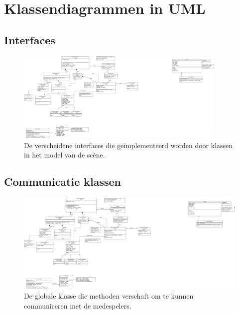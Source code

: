 \documentclass[a4paper,11pt, twoside]{article}
\begin{document}
    \newpage
    \appendix
    \section{Klassendiagrammen in UML}
    \subsection{Interfaces}
    \begin{figure}[h]
    \centering
    	\includegraphics[width=0.9\textwidth]{../Class-diagram/Interfaces.pdf}
    	\caption{De verscheidene interfaces die ge\"implementeerd worden door klassen in het model van de sc\`ene.}
    \end{figure}\FloatBarrier    \label{app:Interfaces}
    \begin{samepage}
    \subsection{Communicatie klassen} \begin{figure}[h]
        \centering  	\includegraphics[width=1.05\textwidth]{../Class-diagram/NetCommunication.pdf}
	\caption{De globale klasse die methoden verschaft om te kunnen communiceren met de medespelers.}
    \end{figure}
    \label{app:Comm}
    \end{samepage}
    \FloatBarrier


    \newpage
\end{document}
